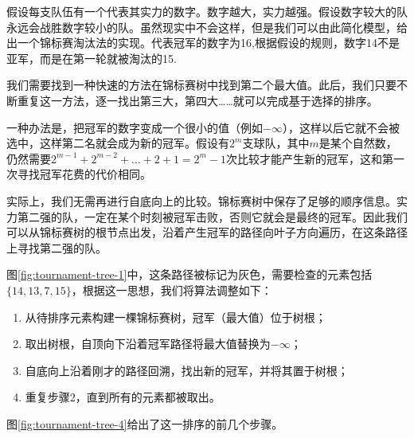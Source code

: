 \documentclass[b5paper]{ctexart}
\begin{document}
假设每支队伍有一个代表其实力的数字。数字越大，实力越强。假设数字较大的队永远会战胜数字较小的队。虽然现实中不会这样，但是我们可以由此简化模型，给出一个锦标赛淘汰法的实现。代表冠军的数字为16,根据假设的规则，数字14不是亚军，而是在第一轮就被淘汰的15.

我们需要找到一种快速的方法在锦标赛树中找到第二个最大值。此后，我们只要不断重复这一方法，逐一找出第三大，第四大……就可以完成基于选择的排序。

一种办法是，把冠军的数字变成一个很小的值（例如$-\infty$），这样以后它就不会被选中，这样第二名就会成为新的冠军。假设有$2^m$支球队，其中$m$是某个自然数，仍然需要$2^{m-1} + 2^{m-2} + ... + 2 + 1 = 2^m-1$次比较才能产生新的冠军，这和第一次寻找冠军花费的代价相同。

实际上，我们无需再进行自底向上的比较。锦标赛树中保存了足够的顺序信息。实力第二强的队，一定在某个时刻被冠军击败，否则它就会是最终的冠军。因此我们可以从锦标赛树的根节点出发，沿着产生冠军的路径向叶子方向遍历，在这条路径上寻找第二强的队。

图\ref{fig:tournament-tree-1}中，这条路径被标记为灰色，需要检查的元素包括$\{14, 13, 7, 15\}$，根据这一思想，我们将算法调整如下：

\begin{enumerate}
\item 从待排序元素构建一棵锦标赛树，冠军（最大值）位于树根；
\item 取出树根，自顶向下沿着冠军路径将最大值替换为$-\infty$；
\item 自底向上沿着刚才的路径回溯，找出新的冠军，并将其置于树根；
\item 重复步骤2，直到所有的元素都被取出。
\end{enumerate}

图\ref{fig:tournament-tree-4}给出了这一排序的前几个步骤。
\end{document}
